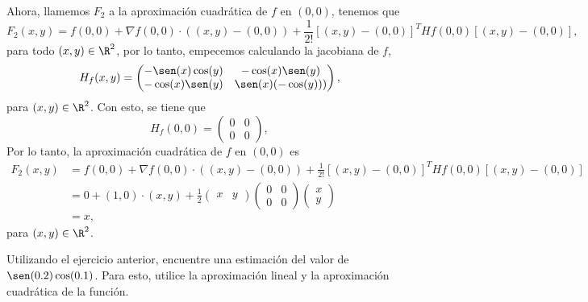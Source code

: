 \documentclass[a4,11pt]{aleph-examen}
\begin{document}
\begin{preguntas}
\begin{respuesta}
\begin{respuesta}
\begin{respuesta}
    Ahora, llamemos $F_2$ a la aproximación cuadrática de $f$ en $(0,0)$, tenemos que
    \[
        F_2(x,y) = f(0,0) + \nabla f(0,0) \cdot ((x,y)-(0,0))  + \frac{1}{2!}[(x,y)-(0,0)]^T Hf(0,0) [(x,y)-(0,0)],
    \]
    para todo $(x,y)\in\R ^2$, por lo tanto, empecemos calculando la jacobiana de $f$,
    \[
        H_f(x,y) = 
        \begin{pmatrix}
            -\sen(x)\cos(y) & -\cos(x)\sen(y)\\
            -\cos(x) \sen(y) & \sen(x) (-\cos(y)))
        \end{pmatrix},
    \]
    para $(x,y)\in\R^2$. Con esto, se tiene que
    \[
        H_f(0,0) = \begin{pmatrix}
            0 & 0\\
            0 & 0
        \end{pmatrix},
    \]
    Por lo tanto, la aproximación cuadrática de $f$ en $(0,0)$ es
    \begin{align*}
        F_2(x,y)
            & = f(0,0) + \nabla f(0,0) \cdot ((x,y)-(0,0))+ \frac{1}{2!}[(x,y)-(0,0)]^T Hf(0,0) [(x,y)-(0,0)]\\
            & = 0 + (1,0)\cdot (x,y) +
            \frac 1 2 
            \begin{pmatrix}
            x&y
            \end{pmatrix}
            \begin{pmatrix}
            0 & 0\\
            0 & 0
            \end{pmatrix}
            \begin{pmatrix}
            x\\y
            \end{pmatrix}\\
            & = x,
    \end{align*}
    para $(x,y)\in\R^2$.
\end{respuesta}

\item  
    Utilizando el ejercicio anterior, encuentre una estimación del valor de $\sen(0.2)\cos(0.1)$. Para esto, utilice la aproximación lineal y la aproximación cuadrática de la función.



\end{respuesta}
\end{respuesta}
\end{preguntas}
\end{document}

